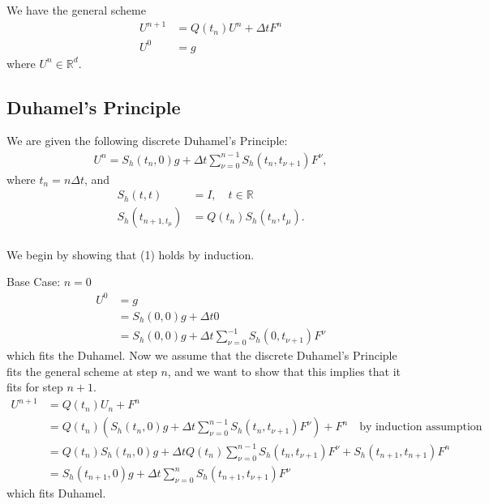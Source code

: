 We have the general scheme 
\begin{align*}
U^{n+1}  &= Q(t_n) U^n + \Delta t F^n \\
U^0 &= g
\end{align*}
where $U^n \in \mathbb{R}^d$. 

\subsection{Duhamel’s Principle}
We are given the following discrete Duhamel’s Principle:
\begin{align}
U^n = S_h(t_n,0)g+\Delta t \sum_{\nu = 0}^{n-1} S_h(t_n , t_{\nu + 1}) F^{\nu} , 
\end{align}
where $t_n = n \Delta t$, and 
\begin{align*}
S_h(t,t) &= I, \quad t \in \mathbb{R} \\
S_h(t_{n+1,t_{\mu}}) &= Q(t_n)S_h(t_n,t_{\mu}).
\end{align*}
\\
We begin by showing that (1) holds by induction.

Base Case: $n = 0$
\begin{align*}
U^0 & = g \\
&= S_h(0,0)g+\Delta t 0 \\
&= S_h(0,0)g+\Delta t \sum_{\nu = 0}^{-1} S_h(0 , t_{\nu + 1}) F^{\nu}
\end{align*}
which fits the Duhamel. 
Now we assume that the discrete Duhamel's Principle fits the general scheme at step $n$, and we want to show that this implies that it fits for step $n+1$.
\begin{align*}
U^{n+1} &= Q(t_n)U_n+F^{n} \\ 
&= Q(t_n)(S_h(t_n,0)g + \Delta t \sum_{\nu = 0}^{n-1} S_h(t_n , t_{\nu + 1}) F^{\nu})+F^{n} \quad \text{by induction assumption} \\ 
&= Q(t_n)S_h(t_n,0)g + \Delta t Q(t_n) \sum_{\nu = 0}^{n-1} S_h(t_n , t_{\nu + 1}) F^{\nu} + S_h(t_{n+1} , t_{n + 1}) F^{n} \\ 
&= S_h(t_{n+1},0)g+\Delta t \sum_{\nu = 0}^{n} S_h(t_{n+1} , t_{\nu + 1}) F^{\nu}
\end{align*}
which fits Duhamel.

